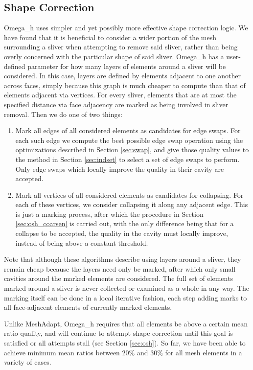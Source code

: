 \subsection{Shape Correction}
\label{sec:osh_shape}

Omega\_h uses simpler and yet possibly more effective shape correction logic.
We have found that it is beneficial to consider a wider portion of the
mesh surrounding a sliver when attempting to remove said sliver, rather
than being overly concerned with the particular shape of said sliver.
Omega\_h has a user-defined parameter for how many layers of elements
around a sliver will be considered.
In this case, layers are defined by elements adjacent to one another
across faces, simply because this graph is much cheaper to compute
than that of elements adjacent via vertices.
For every sliver, elements that are at most the specified distance
via face adjacency are marked as being involved in sliver removal.
Then we do one of two things:
\begin{enumerate}
\item Mark all edges of all considered elements as candidates for edge swaps.
For each such edge we compute the best possible edge swap operation
using the optimizations described in Section \ref{sec:swap},
and give those quality values to the method in Section \ref{sec:indset} to
select a set of edge swaps to perform.
Only edge swaps which locally improve the quality in their cavity are accepted.
\item Mark all vertices of all considered elements as candidates for collapsing.
For each of these vertices, we consider collapsing it along any adjacent edge.
This is just a marking process, after which the procedure in Section \ref{sec:osh_coarsen}
is carried out, with the only difference being that for a collapse to be accepted,
the quality in the cavity must locally improve, instead of being above a
constant threshold.
\end{enumerate}
Note that although these algorithms describe using layers around a sliver,
they remain cheap because the layers need only be marked, after which only
small cavities around the marked elements are considered.
The full set of elements marked around a sliver is never collected or examined
as a whole in any way.
The marking itself can be done in a local iterative fashion, each step adding
marks to all face-adjacent elements of currently marked elements.

Unlike MeshAdapt, Omega\_h requires that all elements be above a certain
mean ratio quality, and will continue to attempt shape correction until
this goal is satisfied or all attempts stall (see Section \ref{sec:osh}).
So far, we have been able to achieve minimum mean ratios between $20\%$
and $30\%$ for all mesh elements in a variety of cases.

